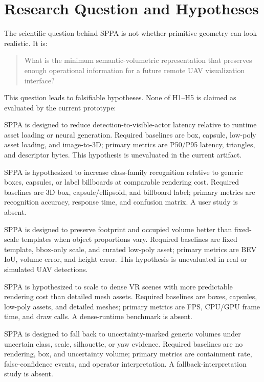 ﻿\documentclass[11pt,a4paper]{article}
\begin{document}
\section{Research Question and Hypotheses}

The scientific question behind SPPA is not whether primitive geometry can look
realistic. It is:

\begin{quote}
What is the minimum semantic-volumetric representation that preserves enough
operational information for a future remote UAV visualization interface?
\end{quote}

This question leads to falsifiable hypotheses. None of H1--H5 is claimed as
evaluated by the current prototype:

\begin{description}[leftmargin=1.2cm,style=nextline]
    \item[H1 latency.] SPPA is designed to reduce detection-to-visible-actor
    latency relative to runtime asset loading or neural generation. Required
    baselines are box, capsule, low-poly asset loading, and image-to-3D; primary
    metrics are P50/P95 latency, triangles, and descriptor bytes. This hypothesis
    is unevaluated in the current artifact.
    \item[H2 recognition.] SPPA is hypothesized to increase class-family
    recognition relative to generic boxes, capsules, or label billboards at
    comparable rendering cost. Required baselines are 3D box,
    capsule/ellipsoid, and billboard label; primary metrics are recognition
    accuracy, response time, and confusion matrix. A user study is absent.
    \item[H3 proportionality.] SPPA is designed to preserve footprint and
    occupied volume better than fixed-scale templates when object proportions
    vary. Required baselines are fixed template, bbox-only scale, and curated
    low-poly asset; primary metrics are BEV IoU, volume error, and height error.
    This hypothesis is unevaluated in real or simulated UAV detections.
    \item[H4 dense runtime.] SPPA is hypothesized to scale to dense VR scenes
    with more predictable rendering cost than detailed mesh assets. Required
    baselines are boxes, capsules, low-poly assets, and detailed meshes; primary
    metrics are FPS, CPU/GPU frame time, and draw calls. A dense-runtime
    benchmark is absent.
    \item[H5 fallback.] SPPA is designed to fall back to uncertainty-marked
    generic volumes under uncertain class, scale, silhouette, or yaw evidence.
    Required baselines are no rendering, box, and uncertainty volume; primary
    metrics are containment rate, false-confidence events, and operator
    interpretation. A fallback-interpretation study is absent.
\end{description}
\end{document}
